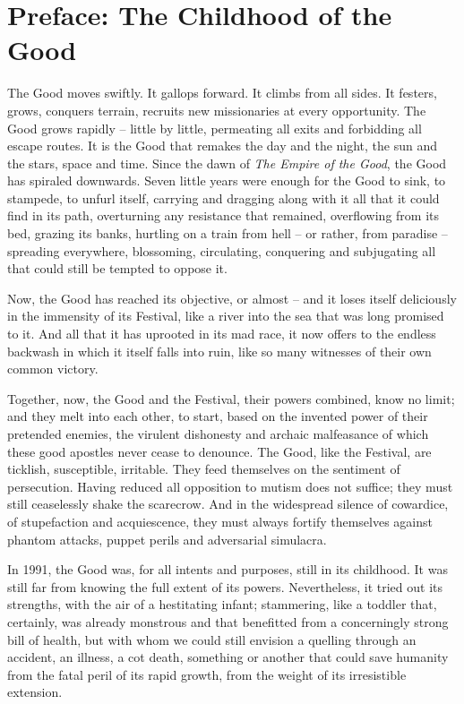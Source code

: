\chapter*{Preface: The Childhood of the Good}
\label{ch:preface}

The Good moves swiftly. It gallops forward. It climbs from all sides. It festers, grows, conquers terrain, recruits new missionaries at every opportunity. The Good grows rapidly -- little by little, permeating all exits and forbidding all escape routes. It is the Good that remakes the day and the night, the sun and the stars, space and time. Since the dawn of \textit{The Empire of the Good}, the Good has spiraled downwards. Seven little years were enough for the Good to sink, to stampede, to unfurl itself, carrying and dragging along with it all that it could find in its path, overturning any resistance that remained, overflowing from its bed, grazing its banks, hurtling on a train from hell -- or rather, from paradise -- spreading everywhere, blossoming, circulating, conquering and subjugating all that could still be tempted to oppose it.

Now, the Good has reached its objective, or almost -- and it loses itself deliciously in the immensity of its Festival, like a river into the sea that was long promised to it. And all that it has uprooted in its mad race, it now offers to the endless backwash in which it itself falls into ruin, like so many witnesses of their own common victory.

Together, now, the Good and the Festival, their powers combined, know no limit; and they melt into each other, to start, based on the invented power of their pretended enemies, the virulent dishonesty and archaic malfeasance of which these good apostles never cease to denounce. The Good, like the Festival, are ticklish, susceptible, irritable. They feed themselves on the sentiment of persecution. Having reduced all opposition to mutism does not suffice; they must still ceaselessly shake the scarecrow. And in the widespread silence of cowardice, of stupefaction and acquiescence, they must always fortify themselves against phantom attacks, puppet perils and adversarial simulacra.

In 1991, the Good was, for all intents and purposes, still in its childhood. It was still far from knowing the full extent of its powers. Nevertheless, it tried out its strengths, with the air of a hestitating infant; stammering, like a toddler that, certainly, was already monstrous and that benefitted from a concerningly strong bill of health, but with whom we could still envision a quelling through an accident, an illness, a cot death, something or another that could save humanity from the fatal peril of its rapid growth, from the weight of its irresistible extension.

